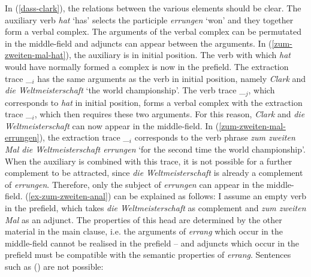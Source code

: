In (\ref{dass-clark}), the relations between the various elements should be clear. The auxiliary
verb \emph{hat} `has' selects the participle \emph{errungen} `won' and they together form a verbal complex. The arguments of the verbal complex can be permutated in the middle-field and adjuncts
can appear between the arguments. In (\ref{zum-zweiten-mal-hat}), the auxiliary is in initial position. The verb with which
\emph{hat} would have normally formed a complex is now in the prefield. The extraction trace \_$_i$ has the same arguments
as the verb in initial position, namely \emph{Clark} and \emph{die Weltmeisterschaft} `the world championship'. The verb trace \_$_j$, which corresponds to
\emph{hat} in initial position, forms a verbal complex with the extraction trace \_$_i$, which then requires these two arguments.
For this reason, \emph{Clark} and \emph{die Weltmeisterschaft} can now appear in the middle-field. In (\ref{zum-zweiten-mal-errungen}),
the extraction trace \_$_i$ corresponds to the verb phrase \emph{zum zweiten Mal die
  Weltmeisterschaft errungen} `for the second time the world championship'. When the auxiliary is
combined with this trace, it is not possible for a further complement to be attracted, since \emph{die Weltmeisterschaft} is already a
complement of \emph{errungen}. Therefore, only the subject of \emph{errungen} can appear in the middle-field.
(\ref{ex-zum-zweiten-anal}) can be explained as follows: I assume an empty verb in the prefield, which takes \emph{die Weltmeisterschaft} as
complement and \emph{zum zweiten Mal} as an adjunct. The properties of this head are determined by the other material in the main clause, i.e.
the arguments of \emph{errang} which occur in the middle-field cannot be realised in the prefield -- and adjuncts which occur in the prefield
must be compatible with the semantic properties of \emph{errang}. Sentences such as () are not possible:
\eal\label{bsp-zu-viele-komplemente-adjunkte}
\zl



